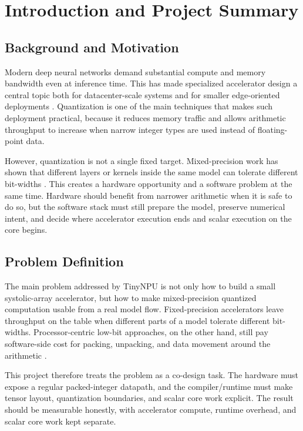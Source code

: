 \documentclass[a4paper, 12pt, titlepage]{article}
\begin{document}
\newpage
\tableofcontents
\newpage

\section{Introduction and Project Summary}
\subsection{Background and Motivation}
Modern deep neural networks demand substantial compute and memory bandwidth even at inference time. This has made specialized accelerator design a central topic both for datacenter-scale systems and for smaller edge-oriented deployments \cite{jouppi2017datacenter, genc2021gemmini}. Quantization is one of the main techniques that makes such deployment practical, because it reduces memory traffic and allows arithmetic throughput to increase when narrow integer types are used instead of floating-point data.

However, quantization is not a single fixed target. Mixed-precision work has shown that different layers or kernels inside the same model can tolerate different bit-widths \cite{wu2018mixedprecision}. This creates a hardware opportunity and a software problem at the same time. Hardware should benefit from narrower arithmetic when it is safe to do so, but the software stack must still prepare the model, preserve numerical intent, and decide where accelerator execution ends and scalar execution on the core begins.

\subsection{Problem Definition}
The main problem addressed by TinyNPU is not only how to build a small systolic-array accelerator, but how to make mixed-precision quantized computation usable from a real model flow. Fixed-precision accelerators leave throughput on the table when different parts of a model tolerate different bit-widths. Processor-centric low-bit approaches, on the other hand, still pay software-side cost for packing, unpacking, and data movement around the arithmetic \cite{garofalo2021xpulpnn, armeniakos2024mixedprecision, reggiani2023mixgemm, fornt2025mixgemm}.

This project therefore treats the problem as a co-design task. The hardware must expose a regular packed-integer datapath, and the compiler/runtime must make tensor layout, quantization boundaries, and scalar core work explicit. The result should be measurable honestly, with accelerator compute, runtime overhead, and scalar core work kept separate.
\end{document}
